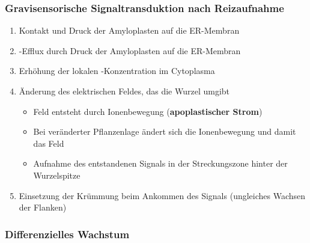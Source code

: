 \documentclass[aspectratio=169
]{beamer}
\begin{document}
\begin{frame}[<+(1)->]
\frametitle{Gravisensorische Signaltransduktion nach Reizaufnahme}

\begin{enumerate}
	\item Kontakt und Druck der Amyloplasten auf die ER-Membran
	\item {}-Efflux durch Druck der Amyloplasten auf die ER-Membran 
	\item Erhöhung der lokalen -Konzentration im Cytoplasma
	\item Änderung des elektrischen Feldes, das die Wurzel umgibt
	\begin{itemize}
		\item Feld entsteht durch Ionenbewegung (\textbf{apoplastischer Strom})
		\item Bei veränderter Pflanzenlage ändert sich die Ionenbewegung und damit das Feld
		\item Aufnahme des entstandenen Signals in der Streckungszone hinter der Wurzelspitze
	\end{itemize}
	
	\item Einsetzung der Krümmung beim Ankommen des Signals (ungleiches Wachsen der Flanken)
\end{enumerate}
\end{frame}
			
\subsubsection{Differenzielles Wachstum}
\end{document}
